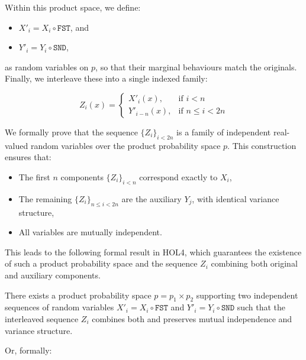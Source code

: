 Within this product space, we define:
\begin{itemize}
    \item $X'_i = X_i \circ \texttt{FST}$, and
    \item $Y'_i = Y_i \circ \texttt{SND}$,
\end{itemize}

as random variables on $p$, so that their marginal behaviours match the originals. Finally, we interleave these into a single indexed family:

\[
    Z_i(x) =
    \begin{cases}
      X'_i(x), & \text{if } i < n \\
      Y'_{i-n}(x), & \text{if } n \leq i < 2n
    \end{cases}
\]

We formally prove that the sequence $\{Z_i\}_{i < 2n}$ is a family of independent real-valued random variables over the product probability space $p$. This construction ensures that:

\begin{itemize}
\item The first $n$ components $\{Z_i\}_{i < n}$ correspond exactly to $X_i$,
\item The remaining $\{Z_i\}_{n \leq i < 2n}$ are the auxiliary $Y_j$, with identical variance structure,
\item All variables are mutually independent.
\end{itemize}

This leads to the following formal result in HOL4, which guarantees the existence of such a product probability space and the sequence $Z_i$ combining both original and auxiliary components.

\begin{theorem}
  \label{thm:construct-aux-seq}
  There exists a product probability space $p = p_1 \times p_2$ supporting two independent sequences of random variables $X'_i = X_i \circ \texttt{FST}$ and $Y'_i = Y_i \circ \texttt{SND}$ such that the interleaved sequence $Z_i$ combines both and preserves mutual independence and variance structure.
\end{theorem}

Or, formally:

